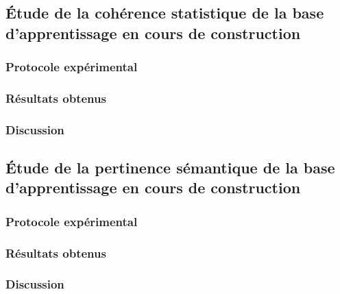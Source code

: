 	\subsection{Étude de la cohérence statistique de la base d'apprentissage en cours de construction}
	
		\subsubsection{Protocole expérimental}

		\subsubsection{Résultats obtenus}

		\subsubsection{Discussion}
	
	\subsection{Étude de la pertinence sémantique de la base d'apprentissage en cours de construction}
	
		\subsubsection{Protocole expérimental}

		\subsubsection{Résultats obtenus}

		\subsubsection{Discussion}